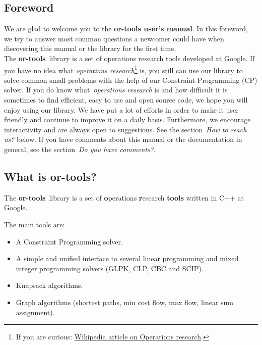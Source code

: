 \begin{titlepage}
\pagestyle{fancy}
\chapter*{Foreword}

We are glad to welcome you to the {\bf or-tools user's manual}. In this foreword, we try
to answer most common questions a newcomer could have when discovering this manual or the library for the first time.\\

The {\bf or-tools}~library is a set of operations research tools developed at Google. 
If you have no idea what \emph{operations research}\footnote{If you are curious: \href{http://en.wikipedia.org/wiki/Operations_research}{Wikipedia article on Operations research}.} is, 
you still can use our library to solve common small problems with the help of our Constraint Programming (CP) solver. If you do know what~\emph{operations research} is and how difficult it is sometimes to find efficient, 
easy to use and open source code, we hope you will enjoy using our library. We have put a lot of efforts in order to make it user friendly and continue to improve it
on a daily basis. Furthermore, we encourage interactivity and are always open to suggestions. See the section~\emph{How to reach us?} below. If you have comments about this manual or the documentation in general, see the section~\emph{Do you have comments?}.

\section*{What is or-tools?}

The {\bf or-tools}~library is a set of {\bf o}perations {\bf r}esearch {\bf tools} written in C++ at Google.

The main tools are:
\begin{itemize}
  \item A Constraint Programming solver.
  \item A simple and unified interface to several linear programming and mixed
integer programming solvers (GLPK, CLP, CBC and SCIP).
  \item Knapsack algorithms.
  \item Graph algorithms (shortest paths, min cost flow, max flow, linear sum assignment).
\end{itemize}


\end{titlepage}
